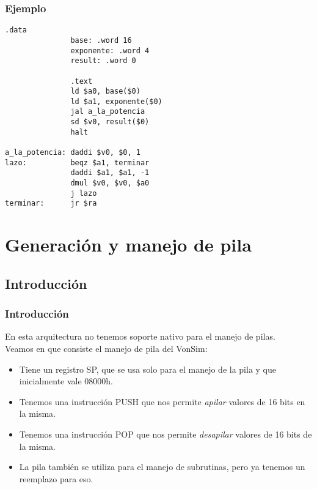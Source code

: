 \documentclass{beamer}
\begin{document}
\begin{frame}[fragile]
\frametitle{Ejemplo}
\tiny{
\begin{block}{}
\begin{lstlisting}[basicstyle=\ttfamily,keywordstyle=\color{blue}]
               .data
               base: .word 16
               exponente: .word 4
               result: .word 0

               .text
               ld $a0, base($0)
               ld $a1, exponente($0)
               jal a_la_potencia
               sd $v0, result($0)
               halt

a_la_potencia: daddi $v0, $0, 1
lazo:          beqz $a1, terminar
               daddi $a1, $a1, -1
               dmul $v0, $v0, $a0
               j lazo
terminar:      jr $ra
\end{lstlisting}
\end{block}
}
\end{frame}


\section{Generación y manejo de pila}
\subsection{Introducción}
\begin{frame}
\frametitle{Introducción}
En esta arquitectura no tenemos soporte nativo para el manejo de pilas. \\
Veamos en que consiste el manejo de pila del VonSim:
\begin{itemize}
\item Tiene un registro SP, que se usa solo para el manejo de la pila y que inicialmente vale 08000h.
\item Tenemos una instrucción PUSH que nos permite \emph{apilar} valores de 16 bits en la misma.
\item Tenemos una instrucción POP que nos permite \emph{desapilar} valores de 16 bits de la misma.
\item La pila también se utiliza para el manejo de subrutinas, pero ya tenemos un reemplazo para eso.
\end{itemize}
\end{frame}
\end{document}
